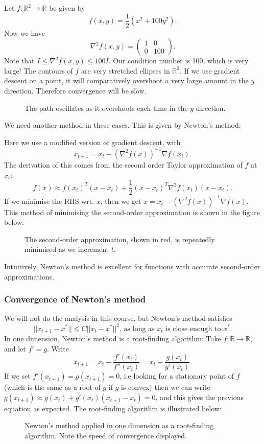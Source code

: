 \documentclass[egregdoesnotlikesansseriftitles,a4paper]{scrartcl}
\begin{document}
\begin{example*}
	Let $f: \mathbb{R}^{2} \to \mathbb{R} $ be given by 
	\[f(x,y)=\frac{1}{2}(x^2+100y^2).\]
	Now we have 
	\[\nabla^2 f (x,y)=\begin{pmatrix}
	1&0\\0&100
	\end{pmatrix}
	.\]
	Note that $I\leq \nabla^2 f (x,y)\leq 100I$. Our condition number is 100, which is very large! The contours of $f$ are very stretched ellipses in $\mathbb{R}^2$. If we use gradient descent on a point, it will comparatively overshoot a very large amount in the $y$ direction. Therefore convergence will be slow.
	\begin{figure}[H]
		\centering
		\caption{The path oscillates as it overshoots each time in the $y$ direction.}
	\end{figure}
\end{example*}
We need another method in these cases. This is given by Newton's method:
\begin{definition*}
	 Here we use a modified version of gradient descent, with 
	 \[x_{t+1}=x_t-(\nabla^2 f (x))^{-1}\nabla f (x_t).\]
	 The derivation of this comes from the second order Taylor approximation of $f$ at $x_t$: 
	 \[f(x)\approx f (x_t)^T (x-x_t)+\frac{1}{2}(x-x_t)^T \nabla^2 f (x_t)(x-x_t).\]
	 If we minimise the RHS wrt. $x$, then we get $x=x_t-(\nabla^2 f(x))^{-1}\nabla f (x)$. This method of minimising the second-order approximation is shown in the figure below:
	 \begin{figure}[H]
		\centering
		\caption{The second-order approximation, shown in red, is repeatedly minimised as we increment $t$.}
	\end{figure}
	 
\end{definition*}
\begin{remark}
	Intuitively, Newton's method is excellent for functions with accurate second-order approximations.
\end{remark}
\subsubsection{Convergence of Newton's method}
We will not do the analysis in this course, but Newton's method satisfies 
\[||x_{t+1}-x^*||\leq C ||x_t-x^*||^2 \text{, as long as } x_t \text{ is close enough to } x^*.\]
In one dimension, Newton's method is a root-finding algorithm:\newline 
Take $f: \mathbb{R} \to \mathbb{R}$, and let $f'=g$. Write 
\[x_{t+1}=x_t-\frac{f'(x_t)}{f'' (x_t)}=x_t-\frac{g (x_t)}{g' (x_t)}.\]
If we set $f'(x_{t+1})=g (x_{t+1})=0$, i.e looking for a stationary point of $f$ (which is the same as a root of $g$ if $g$ is convex) then we can write $g (x_{t+1})\approx g (x_{t})+g' (x_t)(x_{t+1}-x_t)=0$, and this gives the previous equation as expected. The root-finding algorithm is illustrated below:
\begin{figure}[H]
	\centering
	\caption{Newton's method applied in one dimension as a root-finding algorithm. Note the speed of convergence displayed.}
\end{figure}
\end{document}
